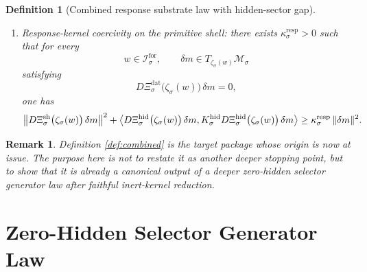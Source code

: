 \documentclass[11pt]{article}
\newcommand{\ForSpace}[1]{\mathcal I_{#1}^{\mathrm{for}}}
\newcommand{\DataSpace}[1]{\mathcal Y_{#1}^{\mathrm{obs}}}
\newcommand{\ProtoSpace}[1]{\mathcal M_{#1}}
\newcommand{\ResponseData}[1]{\Xi_{#1}^{\mathrm{dat}}}
\newcommand{\ResponseShell}[1]{\Xi_{#1}^{\mathrm{sh}}}
\newcommand{\ResponseHidden}[1]{\Xi_{#1}^{\mathrm{hid}}}
\newcommand{\ResponseImage}[1]{\mathcal B_{#1}^{\mathrm{resp}}}
\newcommand{\HiddenOperator}[1]{K_{#1}^{\mathrm{hid}}}
\newcommand{\ProtoEmbed}[1]{\zeta_{#1}}
\newtheorem{definition}{Definition}
\newtheorem{remark}{Remark}
\begin{document}
\begin{definition}[Combined response substrate law with hidden-sector gap]
\begin{enumerate}
\begin{equation}
    =
    \operatorname{pr}_{\DataSpace{\sigma}}
    \Bigl(
    \ResponseImage{\sigma}\cap
    \bigl(
    \DataSpace{\sigma}\oplus\{0\}\oplus\{0\}
    \bigr)
    \Bigr).
    \label{eq:combinedsolvability}
    \end{equation}
    \item Response-kernel coercivity on the primitive shell: there exists \(\kappa_{\sigma}^{\mathrm{resp}}>0\) such that for every
    \[
    w\in\ForSpace{\sigma},
    \qquad
    \delta m\in T_{\ProtoEmbed{\sigma}(w)}\ProtoSpace{\sigma}
    \]
    satisfying
    \[
    D\ResponseData{\sigma}\bigl(\ProtoEmbed{\sigma}(w)\bigr)\,\delta m=0,
    \]
    one has
    \begin{equation}
    \bigl\|
    D\ResponseShell{\sigma}\bigl(\ProtoEmbed{\sigma}(w)\bigr)\,\delta m
    \bigr\|^{2}
    +
    \ev{
    D\ResponseHidden{\sigma}\bigl(\ProtoEmbed{\sigma}(w)\bigr)\,\delta m,
    \HiddenOperator{\sigma}
    D\ResponseHidden{\sigma}\bigl(\ProtoEmbed{\sigma}(w)\bigr)\,\delta m
    }
    \ge
    \kappa_{\sigma}^{\mathrm{resp}}\,
    \|\delta m\|^{2}.
    \label{eq:combinedcoercive}
    \end{equation}
\end{enumerate}
\end{definition}

\begin{remark}
Definition \ref{def:combined} is the target package whose origin is now at issue. The purpose here is not to restate it as another deeper stopping point, but to show that it is already a canonical output of a deeper zero-hidden selector generator law after faithful inert-kernel reduction.
\end{remark}

\section{Zero-Hidden Selector Generator Law}
\end{document}
